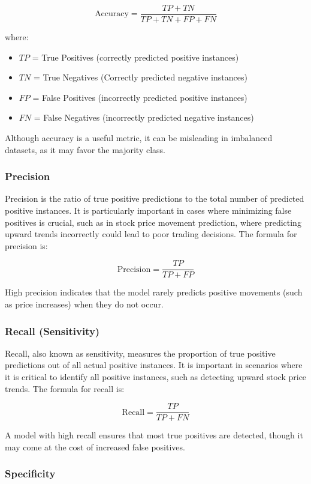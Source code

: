 \documentclass[aodsor,preprint]{imsart}
\numberwithin{equation}{section}
\theoremstyle{plain}
\begin{document}
\[
\text{Accuracy} = \frac{TP + TN}{TP + TN + FP + FN}
\]

where:
\begin{itemize}
    \item \( TP \) = True Positives (correctly predicted positive instances)
    \item \( TN \) = True Negatives (Correctly predicted negative instances)
    \item \( FP \) = False Positives (incorrectly predicted positive instances)
    \item \( FN \) = False Negatives (incorrectly predicted negative instances)
\end{itemize}

Although accuracy is a useful metric, it can be misleading in imbalanced datasets, as it may favor the majority class.

\subsubsection{Precision}

Precision is the ratio of true positive predictions to the total number of predicted positive instances. It is particularly important in cases where minimizing false positives is crucial, such as in stock price movement prediction, where predicting upward trends incorrectly could lead to poor trading decisions. The formula for precision is:

\[
\text{Precision} = \frac{TP}{TP + FP}
\]

High precision indicates that the model rarely predicts positive movements (such as price increases) when they do not occur.

\subsubsection{Recall (Sensitivity)}

Recall, also known as sensitivity, measures the proportion of true positive predictions out of all actual positive instances. It is important in scenarios where it is critical to identify all positive instances, such as detecting upward stock price trends. The formula for recall is:

\[
\text{Recall} = \frac{TP}{TP + FN}
\]

A model with high recall ensures that most true positives are detected, though it may come at the cost of increased false positives.

\subsubsection{Specificity}
\end{document}
